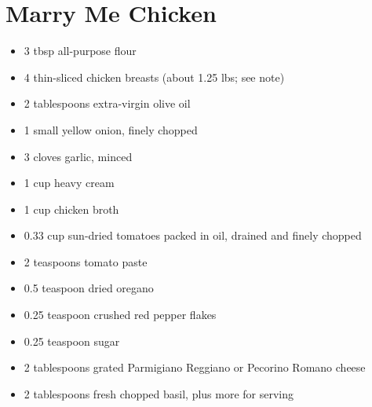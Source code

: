 \section{Marry Me Chicken}

\begin{itemize}
\item 3 tbsp all-purpose flour
\item 4 thin-sliced chicken breasts (about 1.25 lbs; see note)
\item 2 tablespoons extra-virgin olive oil
\item 1 small yellow onion, finely chopped
\item 3 cloves garlic, minced
\item 1 cup heavy cream
\item 1 cup chicken broth
\item 0.33 cup sun-dried tomatoes packed in oil, drained and finely chopped
\item 2 teaspoons tomato paste
\item 0.5 teaspoon dried oregano
\item 0.25 teaspoon crushed red pepper flakes
\item 0.25 teaspoon sugar
\item 2 tablespoons grated Parmigiano Reggiano or Pecorino Romano cheese
\item 2 tablespoons fresh chopped basil, plus more for serving
\end{itemize}

